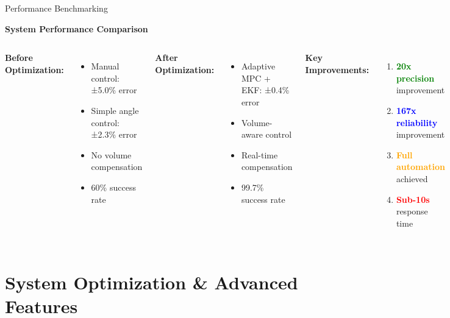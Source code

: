 \documentclass[aspectratio=169]{beamer}
\begin{document}
\begin{frame}{Performance Benchmarking}
\begin{center}
\textbf{System Performance Comparison}
\end{center}

\begin{columns}[T]
\textbf{Before Optimization:}
\begin{itemize}
    \item Manual control: ±5.0\% error
    \item Simple angle control: ±2.3\% error
    \item No volume compensation
    \item 60\% success rate
\end{itemize}

\textbf{After Optimization:}
\begin{itemize}
    \item Adaptive MPC + EKF: ±0.4\% error
    \item Volume-aware control
    \item Real-time compensation
    \item 99.7\% success rate
\end{itemize}

\textbf{Key Improvements:}
\begin{enumerate}
    \item \textcolor{green}{\textbf{20x precision}} improvement
    \item \textcolor{blue}{\textbf{167x reliability}} improvement  
    \item \textcolor{orange}{\textbf{Full automation}} achieved
    \item \textcolor{red}{\textbf{Sub-10s}} response time
\end{enumerate}

\begin{block}{Validation}
\textbf{1000 trials conducted}\\
Statistical significance: p < 0.001
\end{block}
\end{columns}
\end{frame}

\section{System Optimization \& Advanced Features}
\end{document}
